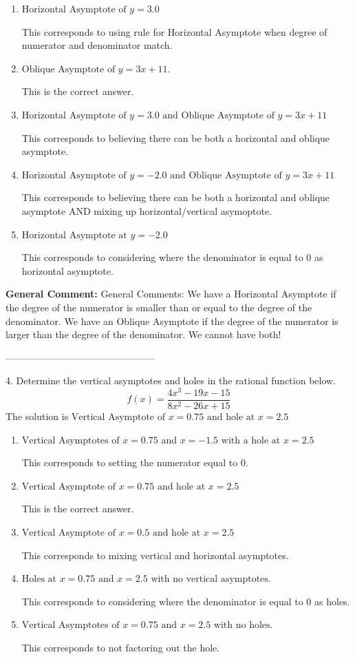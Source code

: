 \documentclass{extbook}[14pt]
\begin{document}
\begin{enumerate}[label=\Alph*.] 
\item $ \text{Horizontal Asymptote of } y = 3.0  $ 

 This corresponds to using rule for Horizontal Asymptote when degree of numerator and denominator match. 
\item $ \text{Oblique Asymptote of } y = 3x + 11. $ 

 This is the correct answer. 
\item $ \text{Horizontal Asymptote of } y = 3.0 \text{ and Oblique Asymptote of } y = 3x + 11 $ 

 This corresponds to believing there can be both a horizontal and oblique asymptote. 
\item $ \text{Horizontal Asymptote of } y = -2.0 \text{ and Oblique Asymptote of } y = 3x + 11 $ 

 This corresponds to believing there can be both a horizontal and oblique asymptote AND mixing up horizontal/vertical asymoptote. 
\item $ \text{Horizontal Asymptote at } y = -2.0 $ 

 This corresponds to considering where the denominator is equal to 0 as horizontal asymptote. 
\end{enumerate} 
 
\textbf{General Comment:} General Comments: We have a Horizontal Asymptote if the degree of the numerator is smaller than or equal to the degree of the denominator. We have an Oblique Asymptote if the degree of the numerator is larger than the degree of the denominator. We cannot have both! 

-----------------------------------------------

4. Determine the vertical asymptotes and holes in the rational function below.
\[ f(x) = \frac{4x^{3} -19 x -15}{8x^{2} -26 x + 15} \] 
The solution is $ \text{Vertical Asymptote of } x = 0.75 \text{ and hole at } x = 2.5 $ 

\begin{enumerate}[label=\Alph*.] 
\item $ \text{Vertical Asymptotes of } x = 0.75 \text{ and } x = -1.5 \text{ with a hole at } x = 2.5 $ 

 This corresponds to setting the numerator equal to 0. 
\item $ \text{Vertical Asymptote of } x = 0.75 \text{ and hole at } x = 2.5 $ 

 This is the correct answer. 
\item $ \text{Vertical Asymptote of } x = 0.5 \text{ and hole at } x = 2.5 $ 

 This corresponds to mixing vertical and horizontal asymptotes. 
\item $ \text{Holes at } x = 0.75 \text{ and } x = 2.5 \text{ with no vertical asymptotes.} $ 

 This corresponds to considering where the denominator is equal to 0 as holes. 
\item $ \text{Vertical Asymptotes of } x = 0.75 \text{ and } x = 2.5 \text{ with no holes.} $ 

 This corresponds to not factoring out the hole. 
\end{enumerate} 
 
\end{document}
